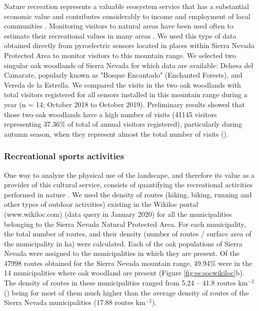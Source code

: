 Nature recreation represents a valuable ecosystem service that has a substantial economic value and contributes considerably to income and employment of local communities \autocites{Schagneretal2017MonitoringRecreation}. Monitoring visitors to natural areas have been used often to estimate their recreational values in many areas \autocites{Schagneretal2017MonitoringRecreation}. We used this type of data obtained directly from pyroelectric sensors located in places within Sierra Nevada Protected Area to monitor visitors to this mountain range. We selected two singular oak woodlands of Sierra Nevada for which data are available: Dehesa del Camarate, popularly known as "Bosque Encantado" (Enchanted Forests), and Vereda de la Estrella. We compared the visits in the two oak woodlands with total visitors registered for all sensors installed in this mountain range during a year (n = 14; October 2018 to October 2019). Preliminary results showed that those two oak woodlands have a high number of visits (41145 visitors representing 37.36\% of total of annual visitors registered), particularly during autumn season, when they represent almost the total number of visits (). 

\subsubsection{Recreational sports activities}\label{sec:es:cultural-sports}
One way to analyze the physical use of the landscape, and therefore its value as a provider of this cultural service, consists of quantifying the recreational activities performed in nature \autocites[\emph{e.g.}][]{RocesDiazetal2018AssessingDistribution}. We used the density of routes (hiking, biking, running and other types of outdoor activities) existing in the Wikiloc portal (www.wikiloc.com) (data query in January 2020) for all the municipalities belonging to the Sierra Nevada Natural Protected Area. For each municipality, the total number of routes, and their density (number of routes / surface area of the municipality in ha) were calculated. Each of the oak populations of Sierra Nevada were assigned to the municipalities in which they are present. Of the 47998 routes obtained for the Sierra Nevada mountain range, 49.94\% were in the 14 municipalities where oak woodland are present (Figure \ref{fig:es:socwikiloc}b). The density of routes in these municipalities ranged from 5.24 – 41.8 routes km$^{-2}$  () being for most of them much higher than the average density of routes of the Sierra Nevada municipalities (17.88 routes km$^{-2}$).

